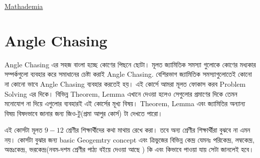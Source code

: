\documentclass[a4paper,11pt]{article}
\begin{document}
\begin{titlepage}
	
	
	\Large \href{https://www.youtube.com/channel/UCi_c260M8xmL-RfpT5yp1OA?}{Mathademia}
	
	\vfill 
	
\end{titlepage}

\tableofcontents
\thispagestyle{empty}
\newpage
\addtocounter{page}{-1}

\section{Angle Chasing}
Angle Chasing এর সহজ বাংলা হচ্ছে কোণের পিছনে ছোটা। মূলত জ্যামিতিক সমস্যা গুলোকে কোণের মধ্যকার সম্পর্কগুলো ব্যবহার করে সমাধানের চেষ্টা করাই Angle Chasing. বেশিরভাগ জ্যামিতিক সমস্যাগুলোতেই কোনো না কোনো ভাবে Angle Chasing ব্যবহার করতেই হয়। এই কোর্সে আমরা মূলত ফোকাস করব Problem Solving এর দিকে। বিভিন্ন Theorem, Lemma এখানে দেওয়া হলেও সেগুলোর প্রমাণের দিকে তেমন মনোযোগ না দিয়ে এগুলোর ব্যবহারই এই কোর্সের মূখ্য বিষয়। Theorem, Lemma এবং জ্যামিতির অন্যান্য বিষয় বিষদভাবে জানার জন্য জিও-টু(প্রমা আপুর কোর্স) টা দেখতে  পারো।

এই কোর্সটা মূলত $9-12$ শ্রেণীর শিক্ষার্থীদের কথা মাথায় রেখে করা। তবে অন্য শ্রেণীর শিক্ষার্থীরা বুঝবে না এমন নয়। কোর্সটা বুঝার জন্য basic Geogemtry concept এবং ত্রিভুজের বিভিন্ন কেন্দ্র যেমনঃ পরিকেন্দ্র, লম্বকেন্দ্র, অন্তঃকেন্দ্র, ভরকেন্দ্র(নবম-দশম শ্রেণীর পাঠ্য বইয়ে দেওয়া আছে ) কি এবং কিভাবে পাওয়া যায় সেটা জানলেই হবে।  
\end{document}
